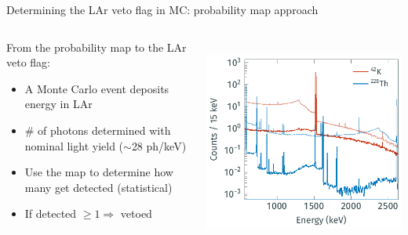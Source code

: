 \documentclass[10pt,aspectratio=169]{beamer}
\begin{document}
\begin{frame}{Determining the LAr veto flag in MC: probability map approach}
  \begin{columns}
    \begin{column}{0.45\textwidth}
      From the probability map to the LAr veto flag:
      \begin{itemize}
        \item A Monte Carlo event deposits energy in LAr
        \item \# of photons determined with nominal light yield ($\sim$28
          ph/keV)
        \item Use the map to determine how many get detected
          (statistical)
        \item If detected $\geq 1 \Rightarrow$ vetoed
      \end{itemize}
    \end{column}
    \begin{column}{0.55\textwidth}
      \centering
      \vspace*{0.5cm} \\
      \includegraphics{plots/bkg/lar/pdfs-example.pdf}
    \end{column}
  \end{columns}
\end{frame}
\end{document}
